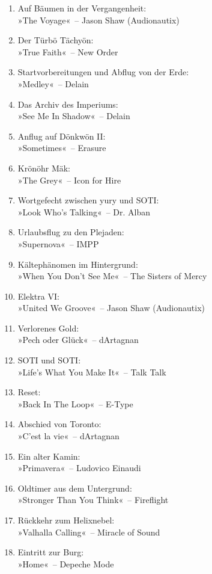 \begin{enumerate}
    \item Auf Bäumen in der Vergangenheit:\\ »The Voyage«~– Jason Shaw (Audionautix)
    \item Der Türbö Tächyön:\\ »True Faith«~– New Order
    \item Startvorbereitungen und Abflug von der Erde:\\ »Medley«~– Delain
    \item Das Archiv des Imperiums:\\ »See Me In Shadow«~– Delain
    \item Anflug auf Dönkwön II:\\ »Sometimes«~– Erasure
    \item Krönöhr Mäk:\\ »The Grey«~– Icon for Hire
    \item Wortgefecht zwischen yury und SOTI:\\ »Look Who’s Talking«~– Dr. Alban
    \item Urlaubsflug zu den Plejaden:\\ »Supernova«~– IMPP
    \item Kältephänomen im Hintergrund:\\ »When You Don't See Me«~– The Sisters of Mercy
    \item Elektra VI:\\ »United We Groove«~– Jason Shaw (Audionautix)
    \item Verlorenes Gold:\\ »Pech oder Glück«~– dArtagnan
    \item SOTI und SOTI:\\ »Life's What You Make It«~– Talk Talk
    \item Reset:\\ »Back In The Loop«~– E-Type
    \item Abschied von Toronto:\\ »C’est la vie«~– dArtagnan
    \item Ein alter Kamin:\\ »Primavera«~– Ludovico Einaudi
    \item Oldtimer aus dem Untergrund:\\ »Stronger Than You Think«~– Fireflight
    \item Rückkehr zum Helixnebel:\\ »Valhalla Calling«~– Miracle of Sound
    \item Eintritt zur Burg:\\ »Home«~– Depeche Mode

\end{enumerate}
